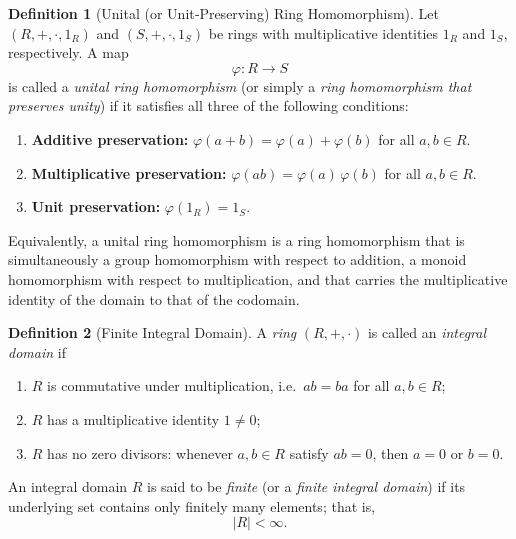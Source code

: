 \documentclass[12pt]{article}
\theoremstyle{definition} %
\newtheorem{definition}{Definition}
\theoremstyle{plain} %
\begin{document}
  \begin{definition}[Unital (or Unit‑Preserving) Ring Homomorphism]
    Let $(R,+,\cdot,1_R)$ and $(S,+,\cdot,1_S)$ be rings with multiplicative identities $1_R$ and $1_S$, respectively.  
    A map
    \[
    \varphi\colon R \longrightarrow S
    \]
    is called a \emph{unital ring homomorphism} (or simply a \emph{ring homomorphism that preserves unity}) if it satisfies all three of the following conditions:
    \begin{enumerate}
      \item \textbf{Additive preservation:} \quad
            $\displaystyle \varphi(a+b)=\varphi(a)+\varphi(b)$ \;for all $a,b\in R$.
      \item \textbf{Multiplicative preservation:} \quad
            $\displaystyle \varphi(ab)=\varphi(a)\,\varphi(b)$ \;for all $a,b\in R$.
      \item \textbf{Unit preservation:} \quad
            $\displaystyle \varphi(1_R)=1_S$.
    \end{enumerate}
    Equivalently, a unital ring homomorphism is a ring homomorphism that is simultaneously a group homomorphism with respect to addition, a monoid homomorphism with respect to multiplication, and that carries the multiplicative identity of the domain to that of the codomain.
    \end{definition}
    \begin{definition}[Finite Integral Domain]
      A \emph{ring} $(R,+,\cdot)$ is called an \emph{integral domain} if
      \begin{enumerate}
        \item $R$ is commutative under multiplication, i.e.\ $ab = ba$ for all $a,b\in R$;
        \item $R$ has a multiplicative identity $1\neq 0$;
        \item $R$ has no zero divisors: whenever $a,b\in R$ satisfy $ab = 0$, then $a = 0$ or $b = 0$.
      \end{enumerate}
      An integral domain $R$ is said to be \emph{finite} (or a \emph{finite integral domain}) if its underlying set contains only finitely many elements; that is,
      \[
        \lvert R \rvert < \infty.
      \]
    \end{definition}
\end{document}
